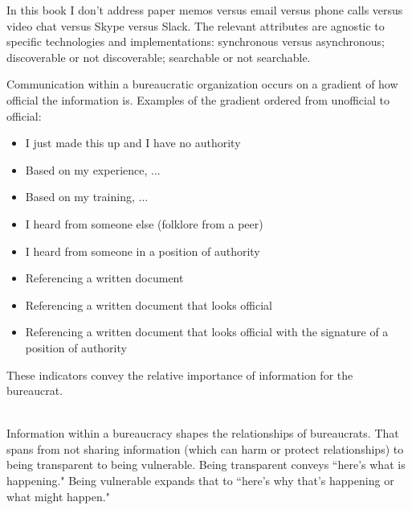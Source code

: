 
In this book I don't address paper memos versus email versus phone calls versus video chat versus Skype versus Slack. 
The relevant attributes are agnostic to specific technologies and implementations: synchronous versus asynchronous; discoverable or not discoverable; searchable or not searchable. 


Communication within a bureaucratic organization occurs on a gradient of how official the information is. Examples of the gradient ordered from unofficial to official:
\begin{itemize}
    \item I just made this up and I have no authority
    \item Based on my experience, ...
    \item Based on my training, ...
    \item I heard from someone else (folklore from a peer)
    \item I heard from someone in a position of authority
    \item Referencing a written document
    \item Referencing a written document that looks official
    \item Referencing a written document that looks official with the signature of a position of authority
\end{itemize}
These indicators convey the relative importance of information for the bureaucrat. 

\ \\

Information within a bureaucracy shapes the relationships of bureaucrats. That spans from not sharing information (which can harm or protect relationships) to being transparent to being vulnerable.  
Being transparent conveys ``here's what is happening." Being vulnerable expands that to ``here's why that's happening or what might happen."

\ \\